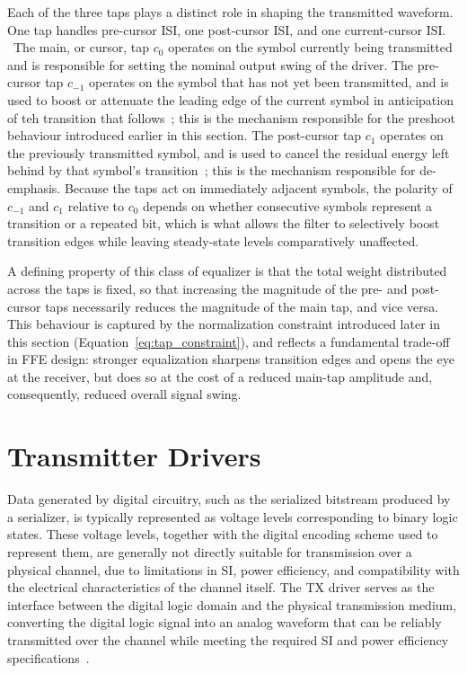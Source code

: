 Each of the three taps plays a distinct role in shaping the transmitted waveform. One tap handles pre-cursor ISI, one post-cursor ISI, and one current-cursor ISI.  The main, or cursor, tap $c_0$ operates on the symbol currently being transmitted and is responsible for setting the nominal output swing of the driver. The pre-cursor tap $c_{-1}$ operates on the symbol that has not yet been transmitted, and is used to boost or attenuate the leading edge of the current symbol in anticipation of teh transition that follows~\cite{chen_tx_equalizer_2009}; this is the mechanism responsible for the preshoot behaviour introduced earlier in this section. The post-cursor tap $c_1$ operates on the previously transmitted symbol, and is used to cancel the residual energy left behind by that symbol's transition~\cite{chen_tx_equalizer_2009,zamir2018_nrz_pam4}; this is the mechanism responsible for de-emphasis. Because the taps act on immediately adjacent symbols, the polarity of $c_{-1}$ and $c_1$ relative to $c_0$ depends on whether consecutive symbols represent a transition or a repeated bit, which is what allows the filter to selectively boost transition edges while leaving steady-state levels comparatively unaffected.

A defining property of this class of equalizer is that the total weight distributed across the taps is fixed, so that increasing the magnitude of the pre- and post-cursor taps necessarily reduces the magnitude of the main tap, and vice versa. This behaviour is captured by the normalization constraint introduced later in this section (Equation~\eqref{eq:tap_constraint}), and reflects a fundamental trade-off in \ac{FFE} design: stronger equalization sharpens transition edges and opens the eye at the receiver, but does so at the cost of a reduced main-tap amplitude and, consequently, reduced overall signal swing. 

\section{Transmitter Drivers} \label{sec:tx_drivers_background}

Data generated by digital circuitry, such as the serialized bitstream produced by a serializer, is typically represented as voltage levels corresponding to binary logic states. These voltage levels, together with the digital encoding scheme used to represent them, are generally not directly suitable for transmission over a physical channel, due to limitations in \ac{SI}, power efficiency, and compatibility with the electrical characteristics of the channel itself. The \ac{TX} driver serves as the interface between the digital logic domain and the physical transmission medium, converting the digital logic signal into an analog waveform that can be reliably transmitted over the channel while meeting the required \ac{SI} and power efficiency specifications~\cite{zamir2018_nrz_pam4}.


